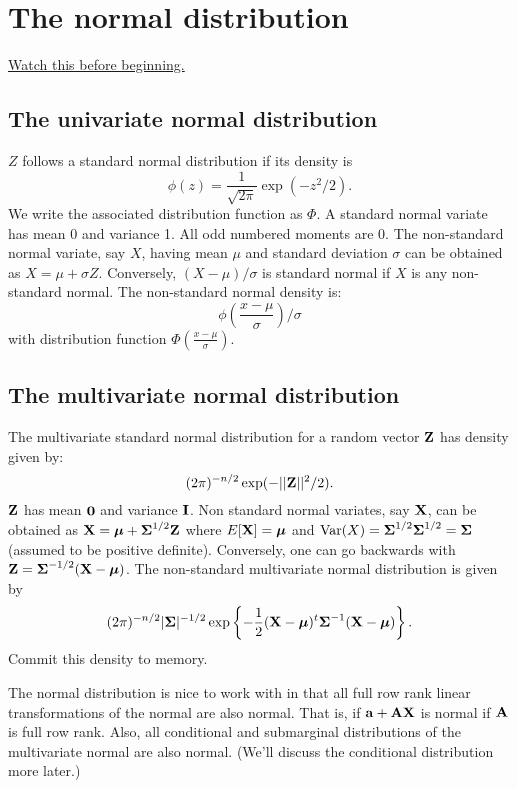 \chapter{The normal distribution}

\href{https://www.youtube.com/watch?v=bI2YDQ8ABiA&list=PLpl-gQkQivXhdgUCdaUQcdb31CRe8Mm2y&index=44}{Watch this before beginning.}


\section{The univariate normal distribution}
$Z$ follows a standard normal distribution if its
density is 
$$
\phi(z) = \frac{1}{\sqrt{2\pi}} \exp(-z^2/2).
$$
We write the associated distribution function as $\Phi$. 
A standard normal variate has mean 0 and variance 1. 
All odd numbered moments are 0. The non-standard
normal variate, say $X$, having mean $\mu$ 
and standard deviation $\sigma$ can be obtained
as $X = \mu + \sigma Z$. Conversely, 
$(X - \mu) / \sigma$ is standard normal if
$X$ is any non-standard normal. The
non-standard normal density is:
$$
\phi\left( \frac{x - \mu}{\sigma}\right) /\sigma
$$
with distribution function $\Phi\left( \frac{x - \mu}{\sigma}\right)$.

\section{The multivariate normal distribution}

The multivariate standard normal distribution for a 
random vector $\mathbf{Z}$ has density given by:
$$
(2 \pi)^{-n/2} \exp( -||\mathbf{Z}||^2 / 2).
$$
$\mathbf{Z}$ has mean $\mathbf{0}$ and variance $\mathbf{I}$. Non standard
normal variates, say $\mathbf{X}$, can be obtained as 
$\mathbf{X} = \boldsymbol{\mu} + \boldsymbol{\Sigma}^{1/2} \mathbf{Z}$ where $E[\mathbf{X}] = \boldsymbol{\mu}$
and $\mbox{Var}(X) = \boldsymbol{\Sigma}^{1/2}\boldsymbol{\Sigma}^{1/2} = \boldsymbol{\Sigma}$ (assumed
to be positive definite). 
Conversely, one can go backwards with 
$\mathbf{Z} = \boldsymbol{\Sigma}^{-1/2} (\mathbf{X} - \boldsymbol{\mu})$. The non-standard
multivariate normal distribution is given by
$$
(2\pi)^{-n/2} |\boldsymbol{\Sigma}|^{-1/2} \exp\left\{ -\frac{1}{2}(\mathbf{X} - \boldsymbol{\mu})^t \boldsymbol{\Sigma}^{-1} (\mathbf{X} - \boldsymbol{\mu}) \right\}.
$$
Commit this density to memory. 

The normal distribution is nice to work with in that
all full row rank linear transformations of the normal are
also normal. That is, if $\mathbf{a} + \mathbf{A} \mathbf{X}$ is normal if $\mathbf{A}$ is
full row rank. Also, all conditional and submarginal distributions
of the multivariate normal are also normal. (We'll discuss the
conditional distribution more later.)

